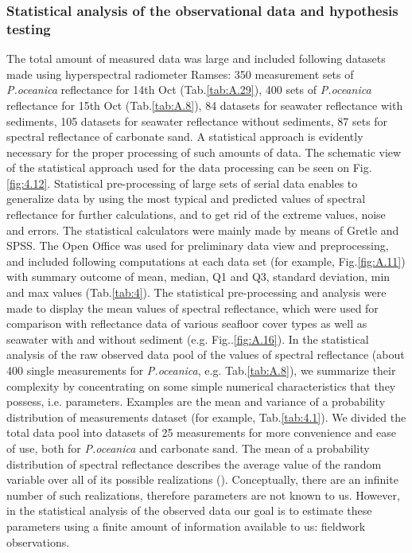 \documentclass[11pt]{article}
\begin{document}
\subsubsection{Statistical analysis of the observational data and hypothesis testing}
The total amount of measured data was large and included following datasets made using
hyperspectral radiometer Ramses: 350 measurement sets of \textit{P.oceanica} reflectance for 14th Oct (Tab.\ref{tab:A.29}), 400
sets of \textit{P.oceanica} reflectance for 15th Oct (Tab.\ref{tab:A.8}), 84 datasets for seawater reflectance with sediments, 105
datasets for seawater reflectance without sediments, 87 sets for spectral reflectance of carbonate sand.
A statistical approach is evidently necessary for the proper processing of such amounts of data. 
The schematic view of the statistical approach used for the data processing  can be seen on Fig. \ref{fig:4.12}.
Statistical pre-processing of large sets of serial data enables to generalize data by using the most typical and predicted values of
spectral reflectance for further calculations, and to get rid of the extreme values, noise and errors.
The statistical calculators were mainly made by means of Gretle and SPSS. 
The Open Office was used for preliminary data view and preprocessing, and included following computations
at each data set (for example, Fig.\ref{fig:A.11}) with summary outcome of mean, median, Q1 and Q3, standard deviation, min and max values (Tab.\ref{tab:4}). 
The statistical pre-processing and analysis were made to display the mean values of spectral reflectance,
which were used for comparison with reflectance data of various seafloor cover types as well as
seawater with and without sediment (e.g. Fig..\ref{fig:A.16}).
In the statistical analysis of the raw observed data pool of the values of spectral reflectance (about 400 single measurements for \textit{P.oceanica}, e.g. Tab.\ref{tab:A.8}), we summarize their complexity by concentrating on some simple numerical characteristics that they possess, i.e. parameters. Examples are the mean and variance of a probability distribution of measurements dataset (for example, Tab.\ref{tab:4.1}). We divided the total data pool into datasets of 25 measurements for more convenience and ease of use, both for \textit{P.oceanica} and carbonate sand. The mean of a probability distribution of spectral reflectance describes the average value of the random variable over all of its possible realizations (). Conceptually, there are an infinite number of such realizations, therefore parameters are not known to us. However, in the statistical analysis of the observed data our goal is to estimate these parameters using a finite amount of information available to us: fieldwork observations. \\
\end{document}
